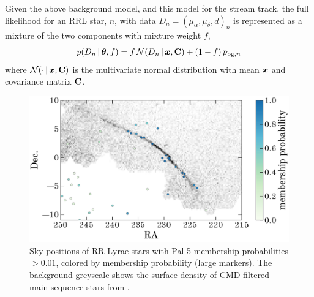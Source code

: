 \documentclass[twocolumn]{aastex63}
\begin{document}
Given the above background model, and this model for the stream track, the full likelihood for an RRL star, $n$, with data $D_n = (\mu_\alpha, \mu_\delta, d)_n$ is represented as a mixture of the two components with mixture weight $f$,
\begin{equation}
    p(D_n \given \bs{\theta}, f) = f \, \mathcal{N}(D_n \given \bs{x}, \mat{C}) + (1-f)\,p_{{\rm bg}, n}
\end{equation}
where $\mathcal{N}(\cdot \,|\, \boldsymbol{x}, \mathbf{C})$ is the multivariate normal distribution with mean $\boldsymbol{x}$ and covariance matrix $\mathbf{C}$.

\begin{figure}[t]
\begin{center}
\includegraphics[width=\textwidth]{members.pdf}
\caption{Sky positions of RR Lyrae stars with Pal 5 membership probabilities $>0.01$, colored by membership probability (large markers). The background greyscale shows the surface density of CMD-filtered main sequence stars from \citet{Bonaca:2019}.}
\label{fig:members}
\end{center}
\end{figure}
\end{document}
